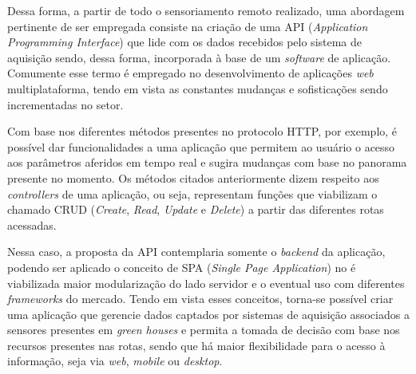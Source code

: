 \documentclass[a4paper, 12pt]{article}
\begin{document}
	Dessa forma, a partir de todo o sensoriamento remoto realizado, uma abordagem pertinente de ser empregada consiste na criação de uma API (\textit{Application Programming Interface}) que lide com os dados recebidos pelo sistema de aquisição sendo, dessa forma, incorporada à base de um \textit{software} de aplicação. Comumente esse termo é empregado no desenvolvimento de aplicações \textit{web} multiplataforma, tendo em vista as constantes mudanças e sofisticações sendo incrementadas no setor. 
	
	Com base nos diferentes métodos presentes no protocolo HTTP, por exemplo, é possível dar funcionalidades a uma aplicação que permitem ao usuário o acesso aos parâmetros aferidos em tempo real e sugira mudanças com base no panorama presente no momento. Os métodos citados anteriormente dizem respeito aos \textit{controllers} de uma aplicação, ou seja, representam funções que viabilizam o chamado CRUD (\textit{Create}, \textit{Read}, \textit{Update} e \textit{Delete}) a partir das diferentes rotas acessadas. 
	
	Nessa caso, a proposta da API contemplaria somente o \textit{backend} da aplicação, podendo ser aplicado o conceito de SPA (\textit{Single Page Application}) no é viabilizada maior modularização do lado servidor e o eventual uso com diferentes \textit{frameworks} do mercado. Tendo em vista esses conceitos, torna-se possível criar uma aplicação que gerencie dados captados por sistemas de aquisição associados a sensores presentes em \textit{green houses} e permita a tomada de decisão com base nos recursos presentes nas rotas, sendo que há maior flexibilidade para o acesso à informação, seja via \textit{web}, \textit{mobile} ou \textit{desktop}.
\end{document}
